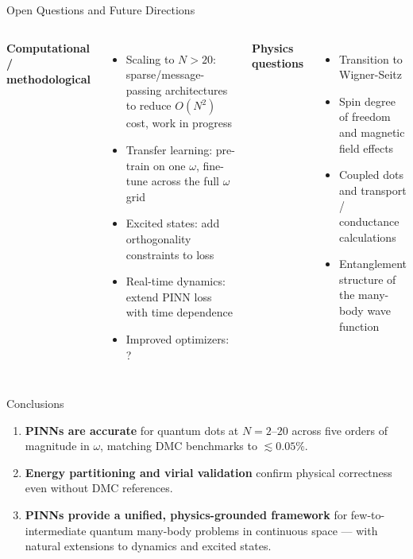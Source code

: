 \documentclass[aspectratio=169,10pt]{beamer}
\begin{document}
\begin{frame}{Open Questions and Future Directions}
  \begin{columns}[T]
      \textbf{Computational / methodological}
      \begin{itemize}
        \item Scaling to $N>20$: sparse/message-passing architectures
              to reduce $O(N^2)$ cost, work in progress
        \item Transfer learning: pre-train on one $\omega$, fine-tune
              across the full $\omega$ grid
        \item Excited states: add orthogonality constraints to loss
        \item Real-time dynamics: extend PINN loss with time dependence
        \item Improved optimizers: ?
      \end{itemize}
      \textbf{Physics questions}
      \begin{itemize}
        \item Transition to Wigner-Seitz 
        \item Spin degree of freedom and magnetic field effects
        \item Coupled dots and transport / conductance calculations
        \item Entanglement structure of the many-body wave function
      \end{itemize}
  \end{columns}
\end{frame}

\begin{frame}{Conclusions}
  \begin{enumerate}\itemsep6pt
    \item \textbf{PINNs are accurate} for quantum dots at $N=2$--$20$
          across five orders of magnitude in $\omega$, matching DMC
          benchmarks to $\lesssim 0.05\%$.


    \item \textbf{Energy partitioning and virial validation} confirm
          physical correctness even without DMC references.


    \item \textbf{PINNs provide a unified, physics-grounded framework}
          for few-to-intermediate quantum many-body problems in
          continuous space — with natural extensions to dynamics and
          excited states.
  \end{enumerate}
\end{frame}
\end{document}
